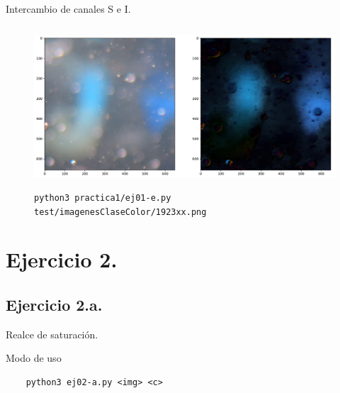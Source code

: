 \documentclass[11pt, spanish]{article}
\begin{document}
Intercambio de canales S e I.
\begin{figure}[H]
\centering
  \includegraphics[height=6cm]{informe-imgs/ej01-e-3.pdf}
  \caption{\texttt{python3 practica1/ej01-e.py test/imagenesClaseColor/1923xx.png}}
\end{figure}

\newpage

\section{Ejercicio 2.}
\subsection{Ejercicio 2.a.}

Realce de saturación.

Modo de uso
\begin{verbatim}
    python3 ej02-a.py <img> <c>
\end{verbatim}
\end{document}
